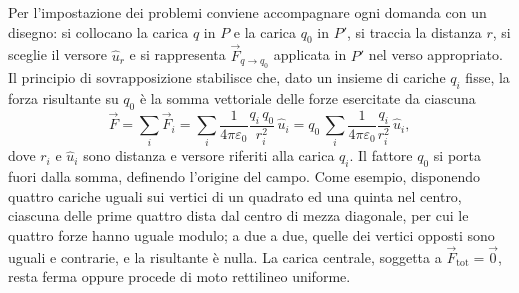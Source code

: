 \documentclass[11pt,a4paper]{article}
\newcommand{\epz}{\varepsilon_0}
\newcommand{\Fv}{\vec{F}}
\newcommand{\uv}{\hat{u}}
\begin{document}
Per l'impostazione dei problemi conviene accompagnare ogni domanda con un disegno: si collocano la carica $q$ in $P$ e la carica $q_0$ in $P'$, si traccia la distanza $r$, si sceglie il versore $\uv_r$ e si rappresenta $\Fv_{q\to q_0}$ applicata in $P'$ nel verso appropriato. Il principio di sovrapposizione stabilisce che, dato un insieme di cariche $q_i$ fisse, la forza risultante su $q_0$ è la somma vettoriale delle forze esercitate da ciascuna
\[
\Fv=\sum_i \Fv_i=\sum_i \frac{1}{4\pi\epz}\frac{q_i\,q_0}{r_i^2}\,\uv_i=q_0\,\sum_i \frac{1}{4\pi\epz}\frac{q_i}{r_i^2}\,\uv_i ,
\]
dove $r_i$ e $\uv_i$ sono distanza e versore riferiti alla carica $q_i$. Il fattore $q_0$ si porta fuori dalla somma, definendo l'origine del campo. Come esempio, disponendo quattro cariche uguali sui vertici di un quadrato ed una quinta nel centro, ciascuna delle prime quattro dista dal centro di mezza diagonale, per cui le quattro forze hanno uguale modulo; a due a due, quelle dei vertici opposti sono uguali e contrarie, e la risultante è nulla. La carica centrale, soggetta a $\Fv_{\mathrm{tot}}=\vec 0$, resta ferma oppure procede di moto rettilineo uniforme.
\end{document}
